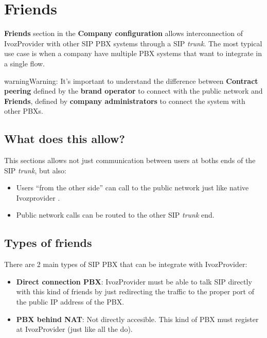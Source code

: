 \documentclass[letterpaper,10pt,english]{sphinxmanual}
\begin{document}
\section{Friends}
\label{company/friends:friends}\label{company/friends::doc}
\textbf{Friends} section in the \textbf{Company configuration} allows interconnection of
IvozProvider with other SIP PBX systems through a SIP \emph{trunk}. The most typical
use case is when a company have multiple PBX systems that want to integrate in
a single flow.

\begin{notice}{warning}{Warning:}
It's important to understand the difference between \textbf{Contract peering}
defined by the \textbf{brand operator} to connect with the public network
and \textbf{Friends}, defined by \textbf{company administrators} to connect the
system with other PBXs.
\end{notice}


\subsection{What does this allow?}
\label{company/friends:what-does-this-allow}
This sections allows not just communication between users at boths ends of the
SIP \emph{trunk}, but also:
\begin{itemize}
\item {} 
Users ``from the other side'' can call to the public network just like native
Ivozprovider {\hyperref[company/users:users]{}}.

\item {} 
Public network calls can be routed to the other SIP \emph{trunk} end.

\end{itemize}


\subsection{Types of friends}
\label{company/friends:types-of-friends}
There are 2 main types of SIP PBX that can be integrate with IvozProvider:
\begin{itemize}
\item {} 
\textbf{Direct connection PBX}: IvozProvider must be able to talk SIP directly with
this kind of friends by just redirecting the traffic to the proper port of
the public IP address of the PBX.

\item {} 
\textbf{PBX behind NAT}: Not directly accesible. This kind of PBX must register at
IvozProvider (just like all the {\hyperref[company/terminals:terminals]{}} do).

\end{itemize}
\end{document}
